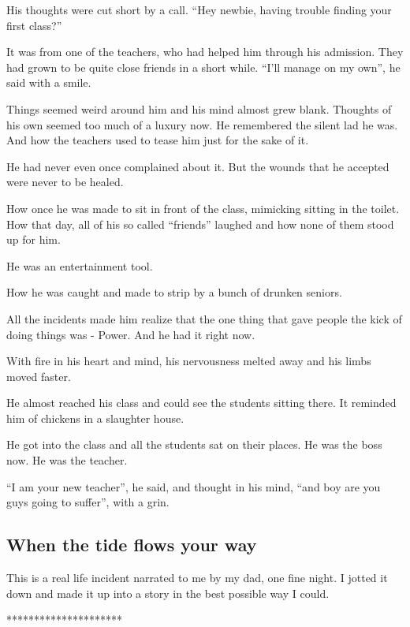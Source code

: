\documentclass[twoside,11pt,titlepage]{article}
\begin{document}
His thoughts were cut short by a call. ``Hey newbie, having trouble finding your first class?''

It was from one of the teachers, who had helped him through his admission. They had grown to be quite close friends in a short while. ``I'll manage on my own'', he said with a smile.

Things seemed weird around him and his mind almost grew blank. Thoughts of his own seemed too much of a luxury now. He remembered the silent lad he was. And how the teachers used to tease him just for the sake of it.

He had never even once complained about it. But the wounds that he accepted were never to be healed.

How once he was made to sit in front of the class, mimicking sitting in the toilet. How that day, all of his so called ``friends'' laughed and how none of them stood up for him.

He was an entertainment tool.

How he was caught and made to strip by a bunch of drunken seniors.

All the incidents made him realize that the one thing that gave people the kick of doing things was -  Power. And he had it right now.

With fire in his heart and mind, his nervousness melted away and his limbs moved faster.

He almost reached his class and could see the students sitting there. It reminded him of chickens in a slaughter house.

He got into the class and all the students sat on their places. He was the boss now. He was the teacher.

``I am your new teacher'', he said, and thought in his mind, ``and boy are you guys going to suffer'', with a grin.

\newpage
\begin{center}
  \section{When the tide flows your way}
\end{center}
\bigskip
\bigskip
\bigskip

This is a real life incident narrated to me by my dad, one fine night. I jotted it down and made it up into a story in the best possible way I could.

\bigskip
\begin{center}
*********************
\end{center}
\end{document}
